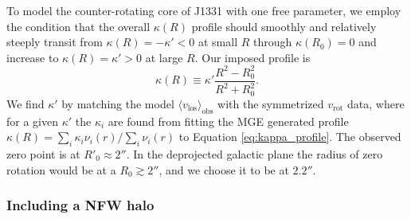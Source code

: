 \documentclass[useAMS,usenatbib]{mnras}
\begin{document}
To model the counter-rotating core of J1331 with one free parameter, we employ the condition that the overall $\kappa(R)$ profile should smoothly and relatively steeply transit from $\kappa(R) = -\kappa' < 0$ at small $R$ through $\kappa(R_0) = 0$ and increase to $\kappa(R) = \kappa' > 0$ at large $R$. Our imposed profile is
\begin{equation}
\kappa(R) \equiv \kappa' \frac{R^2 - R_0^2}{R^2 + R_0^2}. \label{eq:kappa_profile}
\end{equation}
We find $\kappa'$ by matching the model $\langle v_\text{los} \rangle_\text{obs}$ with the symmetrized $v_\text{rot}$ data, where for a given $\kappa'$ the $\kappa_i$ are found from fitting the MGE generated profile $\kappa(R) = \sum_i \kappa_i \nu_i(r)/\sum_i \nu_i(r)$ to Equation \eqref{eq:kappa_profile}. The observed zero point is at $R'_0\approx 2''$. In the deprojected galactic plane the radius of zero rotation would be at a $R_0 \gtrsim 2''$, and we choose it to be at $2.2''$.

\subsubsection{Including a NFW halo} \label{sec:model_JAM_NFW}
\end{document}
